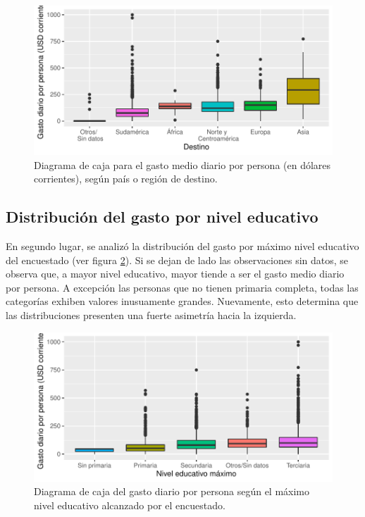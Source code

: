 \documentclass[
]{article}
\begin{document}
\begin{figure}[H]

{\centering \includegraphics{Informe-Proyectofinal_files/figure-latex/boxplot1-1} 

}

\caption{Diagrama de caja para el gasto medio diario por persona (en dólares corrientes), según país o región de destino.}\label{fig:boxplot1}
\end{figure}

\hypertarget{distribuciuxf3n-del-gasto-por-nivel-educativo}{%
\subsection{Distribución del gasto por nivel
educativo}\label{distribuciuxf3n-del-gasto-por-nivel-educativo}}

En segundo lugar, se analizó la distribución del gasto por máximo nivel
educativo del encuestado (ver figura \ref{fig:boxplot2}). Si se dejan de
lado las observaciones sin datos, se observa que, a mayor nivel
educativo, mayor tiende a ser el gasto medio diario por persona. A
excepción las personas que no tienen primaria completa, todas las
categorías exhiben valores inusuamente grandes. Nuevamente, esto
determina que las distribuciones presenten una fuerte asimetría hacia la
izquierda.

\begin{figure}[H]

{\centering \includegraphics{Informe-Proyectofinal_files/figure-latex/boxplot2-1} 

}

\caption{Diagrama de caja del gasto diario por persona según el máximo nivel educativo alcanzado por el encuestado.}\label{fig:boxplot2}
\end{figure}
\end{document}
